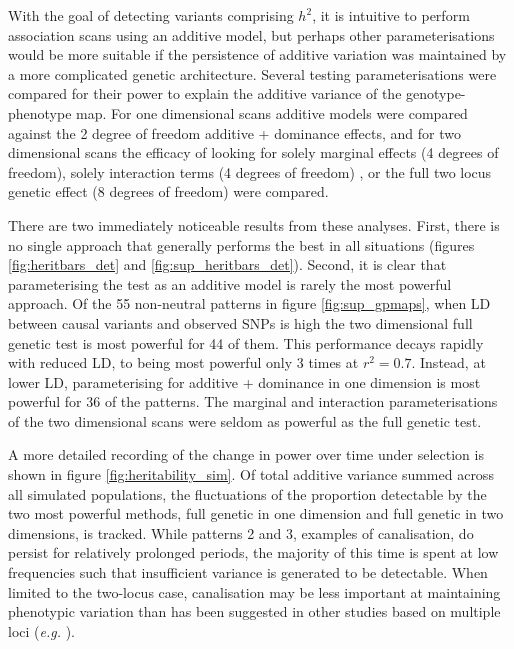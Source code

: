 With the goal of detecting variants comprising $h^2$, it is intuitive to perform association scans using an additive model, but perhaps other parameterisations would be more suitable if the persistence of additive variation was maintained by a more complicated genetic architecture. Several testing parameterisations were compared for their power to explain the additive variance of the genotype-phenotype map. For one dimensional scans additive models were compared against the 2 degree of freedom additive + dominance effects, and for two dimensional scans the efficacy of looking for solely marginal effects (4 degrees of freedom), solely interaction terms (4 degrees of freedom) \citep{Cordell2002}, or the full two locus genetic effect (8 degrees of freedom) were compared.

There are two immediately noticeable results from these analyses. First, there is no single approach that generally performs the best in all situations (figures \ref{fig:heritbars_det} and \ref{fig:sup_heritbars_det}). Second, it is clear that parameterising the test as an additive model is rarely the most powerful approach. Of the 55 non-neutral patterns in figure \ref{fig:sup_gpmaps}, when LD between causal variants and observed SNPs is high the two dimensional full genetic test is most powerful for 44 of them. This performance decays rapidly with reduced LD, to being most powerful only 3 times at $r^2=0.7$. Instead, at lower LD, parameterising for additive + dominance in one dimension is most powerful for 36 of the patterns. The marginal and interaction parameterisations of the two dimensional scans were seldom as powerful as the full genetic test.

A more detailed recording of the change in power over time under selection is shown in figure \ref{fig:heritability_sim}. Of total additive variance summed across all simulated populations, the fluctuations of the proportion detectable by the two most powerful methods, full genetic in one dimension and full genetic in two dimensions, is tracked. While patterns 2 and 3, examples of canalisation, do persist for relatively prolonged periods, the majority of this time is spent at low frequencies such that insufficient variance is generated to be detectable. When limited to the two-locus case, canalisation may be less important at maintaining phenotypic variation than has been suggested in other studies based on multiple loci (\emph{e.g.} \citealp{Carter2005}).

